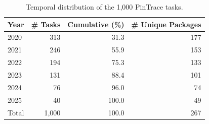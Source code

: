 \begin{table}[t]
\caption{Temporal distribution of the 1,000 PinTrace tasks.}
\label{tab:dataset_temporal}
\begin{tabular}{lrrr}
\toprule
Year & \# Tasks & Cumulative (\%) & \# Unique Packages \\
\midrule
2020 & 313 & 31.3  & 177 \\
2021 & 246 & 55.9  & 153 \\
2022 & 194 & 75.3  & 133 \\
2023 & 131 & 88.4  & 101 \\
2024 & 76 & 96.0  & 74 \\
2025 & 40 & 100.0  & 49 \\
\midrule
Total & 1,000 & 100.0 & 267 \\
\bottomrule
\end{tabular}
\end{table}

